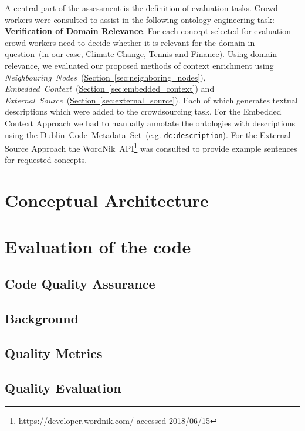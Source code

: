 \documentclass[draft,final]{vutinfth} %
\begin{document}
A central part of the assessment is the definition of evaluation tasks. Crowd workers were consulted to assist in the following ontology engineering task: \textbf{Verification of Domain Relevance}. For each concept selected for evaluation crowd workers need to decide whether it is relevant for the domain in question~(in our case, Climate Change, Tennis and Finance).
Using domain relevance, we evaluated our proposed methods of context enrichment using \emph{Neighbouring~Nodes}~(\hyperref[sec:neighboring_nodes]{Section~\ref*{sec:neighboring_nodes}}), \emph{Embedded~Context}~(\hyperref[sec:embedded_context]{Section~\ref*{sec:embedded_context}}) and \emph{External~Source}~(\hyperref[sec:external_source]{Section~\ref*{sec:external_source}}). Each of which generates textual descriptions which were added to the crowdsourcing task. For the Embedded Context Approach we had to manually annotate the ontologies with descriptions using the Dublin~Code~Metadata~Set~(e.g. \texttt{dc:description}). For the External Source Approach the WordNik~API\footnote{\url{https://developer.wordnik.com/} accessed 2018/06/15} was consulted to provide example sentences for requested concepts. 


\chapter{Conceptual Architecture}\label{chap:conceptual_architecture}




\chapter{Evaluation of the code}
\section{Code Quality Assurance}
\section{Background}
\section{Quality Metrics}
\section{Quality Evaluation}
\end{document}
